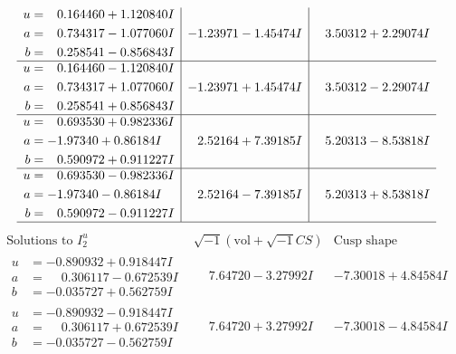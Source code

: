 \documentclass[1p]{elsarticle_modified}
\theoremstyle{definition}
\newcommand{\I}{\sqrt{-1}}
\begin{document}
$$\begin{array}{c|c|c}
\begin{aligned}
u &= \phantom{-}0.164460 + 1.120840 I \\
a &= \phantom{-}0.734317 - 1.077060 I \\
b &= \phantom{-}0.258541 - 0.856843 I\end{aligned}
 & -1.23971 - 1.45474 I & \phantom{-}3.50312 + 2.29074 I \\ \hline\begin{aligned}
u &= \phantom{-}0.164460 - 1.120840 I \\
a &= \phantom{-}0.734317 + 1.077060 I \\
b &= \phantom{-}0.258541 + 0.856843 I\end{aligned}
 & -1.23971 + 1.45474 I & \phantom{-}3.50312 - 2.29074 I \\ \hline\begin{aligned}
u &= \phantom{-}0.693530 + 0.982336 I \\
a &= -1.97340 + 0.86184 I \\
b &= \phantom{-}0.590972 + 0.911227 I\end{aligned}
 & \phantom{-}2.52164 + 7.39185 I & \phantom{-}5.20313 - 8.53818 I \\ \hline\begin{aligned}
u &= \phantom{-}0.693530 - 0.982336 I \\
a &= -1.97340 - 0.86184 I \\
b &= \phantom{-}0.590972 - 0.911227 I\end{aligned}
 & \phantom{-}2.52164 - 7.39185 I & \phantom{-}5.20313 + 8.53818 I\\
 \hline 
 \end{array}$$\newpage$$\begin{array}{c|c|c}  
\text{Solutions to }I^u_{2}& \I (\text{vol} + \sqrt{-1}CS) & \text{Cusp shape}\\
 \hline 
\begin{aligned}
u &= -0.890932 + 0.918447 I \\
a &= \phantom{-}0.306117 - 0.672539 I \\
b &= -0.035727 + 0.562759 I\end{aligned}
 & \phantom{-}7.64720 - 3.27992 I & -7.30018 + 4.84584 I \\ \hline\begin{aligned}
u &= -0.890932 - 0.918447 I \\
a &= \phantom{-}0.306117 + 0.672539 I \\
b &= -0.035727 - 0.562759 I\end{aligned}
 & \phantom{-}7.64720 + 3.27992 I & -7.30018 - 4.84584 I \\ \hline\begin{aligned}

\end{aligned}
\end{array}$$
\end{document}
